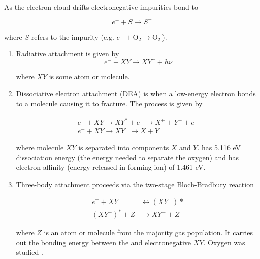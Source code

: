 As the electron cloud drifts electronegative impurities bond to \electron

\begin{equation}
e^{-} + S \rightarrow S^{-}
\label{eq:impurity_attach}
\end{equation}

\noindent where $S$ refers to the impurity (e.g. $e^- + \mathrm{O_2} \rightarrow \mathrm{O_2^-}$).

\begin{enumerate}
\item Radiative attachment is given by
\begin{equation}
e^- + XY \rightarrow XY^- + h \nu
\end{equation}

\noindent where $XY$ is some atom or molecule.

\item Dissociative electron attachment (DEA) is when a low-energy electron bonds to a molecule causing it to fracture.  The process
is given by

\begin{equation}
\begin{aligned}
e^- + XY \rightarrow XY^* + e^- \rightarrow X^+ + Y^- + e^- \\
e^- + XY \rightarrow XY^- \rightarrow X + Y^-
\end{aligned}
\end{equation}

\noindent where molecule $XY$ is separated into components $X$ and $Y$.   has 5.116 eV dissociation energy (the energy needed to
separate the oxygen) and  has electron affinity (energy released in forming ion) of 1.461 eV.

\item Three-body attachment proceeds via the two-stage Bloch-Bradbury reaction 

\begin{equation}
\begin{aligned}
e^- + XY &\leftrightarrow (XY^-)* \\
(XY^-)^* + Z &\rightarrow XY^- + Z
\end{aligned}
\end{equation}

\noindent where $Z$ is an atom or molecule from the majority gas population.  It carries out the bonding energy between the
\electron and electronegative $XY$.  Oxygen was studied .
\end{enumerate}



